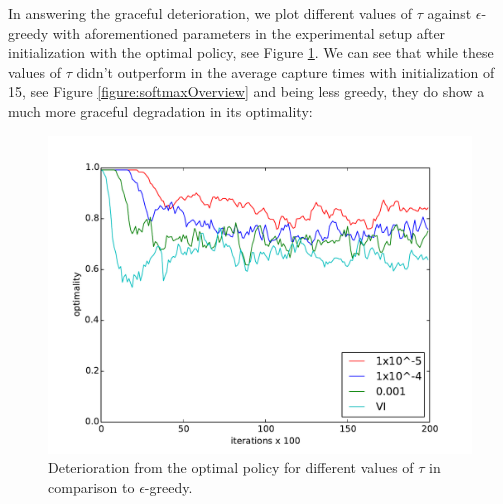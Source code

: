 \documentclass[paper=a4, fontsize=11pt]{scrartcl}
\numberwithin{equation}{section}		%
\numberwithin{figure}{section}			%
\numberwithin{table}{section}				%
\begin{document}
In answering the graceful deterioration, we plot different values of $\tau$ against $\epsilon$-greedy with aforementioned parameters in the experimental setup after initialization with the optimal policy, see Figure \ref{figure:softmxGrace}. We can see that while these values of $\tau$ didn't outperform in the average capture times with initialization of 15, see Figure \ref{figure:softmaxOverview} and being less greedy, they do show a much more graceful degradation in its optimality:
\begin{figure}[H] \centering
\includegraphics[scale=0.6]{softmaxGrace.pdf}
\caption{Deterioration from the optimal policy for different values of $\tau$ in comparison to $\epsilon$-greedy.} 
\label{figure:softmxGrace}
\end{figure}
\end{document}
